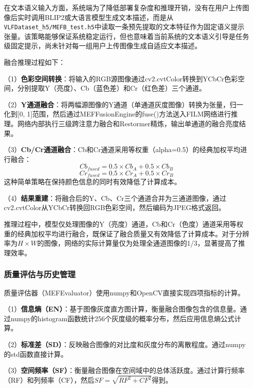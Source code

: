 在文本语义输入方面，系统端为了降低部署复杂度和推理开销，没有在用户上传图像后实时调用BLIP2或大语言模型生成文本描述，而是从\texttt{VLFDataset\_h5/MEFB\_test.h5}中读取一条预先提取的文本特征作为固定语义提示张量。该策略能够保证系统稳定运行，但也意味着当前系统的文本语义引导是任务级固定提示，尚未针对每一组用户上传图像生成自适应文本描述。

融合推理过程如下：

（1）\textbf{色彩空间转换}：将输入的RGB源图像通过cv2.cvtColor转换到YCbCr色彩空间，分别提取Y（亮度）、Cb（蓝色差）和Cr（红色差）三个通道。

（2）\textbf{Y通道融合}：将两幅源图像的Y通道（单通道灰度图像）转换为张量，归一化到[0, 1]范围，然后通过MEFFusionEngine的fuse()方法送入FILM网络进行推理。网络内部执行三级跨注意力融合和Restormer精炼，输出单通道的融合亮度结果。

（3）\textbf{Cb/Cr通道融合}：Cb和Cr通道采用等权重（alpha=0.5）的经典加权平均进行融合：
\begin{equation}
    Cb_{fused} = 0.5 \times Cb_A + 0.5 \times Cb_B
\end{equation}
\begin{equation}
    Cr_{fused} = 0.5 \times Cr_A + 0.5 \times Cr_B
\end{equation}
这种简单策略在保持颜色信息的同时有效降低了计算成本。

（4）\textbf{结果重建}：将融合后的Y、Cb、Cr三个通道合并为三通道图像，通过cv2.cvtColor从YCbCr转换回RGB色彩空间，然后编码为JPEG格式返回。

推理过程中，模型仅处理图像的Y（亮度）通道，Cb和Cr（色度）通道采用等权重的经典加权平均进行融合，既保证了融合质量又有效降低了计算成本。对于分辨率为$H \times W$的图像，网络的实际计算量仅为处理全通道图像的1/3，显著提高了推理效率。

\subsubsection{质量评估与历史管理}\label{sec:evaluation_history}

质量评估器（MEFEvaluator）使用numpy和OpenCV直接实现四项指标的计算。

（1）\textbf{信息熵（EN）}：基于图像灰度直方图计算，衡量融合图像包含的信息量。通过numpy的histogram函数统计256个灰度级的概率分布，然后应用信息熵公式计算。

（2）\textbf{标准差（SD）}：反映融合图像的对比度和灰度分布的离散程度。通过numpy的std函数直接计算。

（3）\textbf{空间频率（SF）}：衡量融合图像在空间域中的总体活跃度。通过计算行频率（RF）和列频率（CF），然后$SF = \sqrt{RF^2 + CF^2}$得到。

